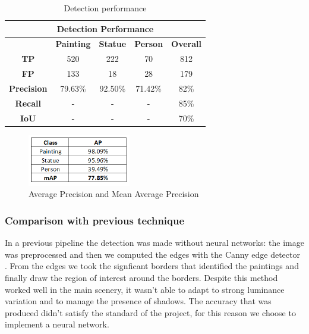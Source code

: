 \begin{table}[ht]
    \centering
    \begin{tabular}{|c|c|c|c|c|}
    \hline
    \multicolumn{5}{|c|}{\textbf{Detection   Performance}}  \\ \hline
    \multicolumn{1}{|l|}{} & \textbf{Painting} & \textbf{Statue} & \textbf{Person} & \textbf{Overall} \\ \hline
    \textbf{TP}        & 520     & 222     & 70      & 812  \\ \hline
    \textbf{FP}        & 133     & 18      & 28      & 179  \\ \hline
    \textbf{Precision} & 79.63\% & 92.50\% & 71.42\% & 82\% \\ \hline
    \textbf{Recall}    & -       & -       & -       & 85\% \\ \hline
    \textbf{IoU}       & -       & -       & -       & 70\% \\ \hline
    \end{tabular}
    \caption{Detection performance}
    \label{tab:detection_performance}
    \end{table}

\begin{figure}[h]
    \centering
        \includegraphics[width=0.4\textwidth]{pictures/painting_detection/tabella2.png}
    \caption{Average Precision and Mean Average Precision}
    \label{fig:figura3}
\end{figure}

\subsubsection{Comparison with previous technique}
In a previous pipeline the detection was made without neural networks:
the image was preprocessed and then we computed the edges with the Canny edge detector \cite{canny}. From the edges we took the signficant borders that identified the paintings and finally draw the region of interest around the borders. Despite this method worked well in the main scenery, it wasn't able to adapt to strong luminance variation and to manage the presence of shadows.
The accuracy that was produced didn't satisfy the standard of the project, for this reason we choose to implement a neural network.

